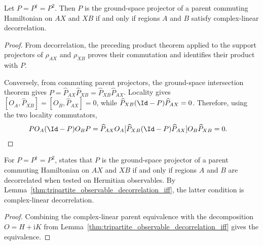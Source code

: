\begin{lemma}
    \label{thm:tripartite_parent_iff_complex_linear_decorrelated}
    \leanok
    Let $P=P^\dagger=P^2$. Then $P$ is the ground-space projector of a
    parent commuting Hamiltonian on $AX$ and $XB$ if and only if regions
    $A$ and $B$ satisfy complex-linear decorrelation.
\end{lemma}

\begin{proof}
    \leanok
    From decorrelation, the preceding product theorem applied to the support
    projectors of $\rho_{AX}$ and $\rho_{XB}$ proves their commutation and
    identifies their product with $P$.

    Conversely, from commuting parent projectors, the ground-space intersection
    theorem gives
    $P=\widehat P_{AX}\widehat P_{XB}
        =\widehat P_{XB}\widehat P_{AX}$. Locality gives
    $[O_A,\widehat P_{XB}]=[O_B,\widehat P_{AX}]=0$, while
    $\widehat P_{XB}(\Id-P)\widehat P_{AX}=0$.
    Therefore, using the two locality commutators,
    \begin{align}
        P O_A(\Id-P)O_B P
         & =\widehat P_{AX}O_A
        [\widehat P_{XB}(\Id-P)\widehat P_{AX}]
        O_B\widehat P_{XB}=0.
        \notag
    \end{align}
\end{proof}

\begin{theorem}
    \label{thm:tripartite_parent_iff_decorrelated}
    \leanok
    For $P=P^\dagger=P^2$,
    \cite[Proposition~D.3, lines 2221--2289]{Cirac2016MPDO_arXiv} states that
    $P$ is the ground-space projector of a parent commuting Hamiltonian on $AX$
    and $XB$ if and only if regions $A$ and $B$ are decorrelated when tested on
    Hermitian observables. By
    Lemma~\ref{thm:tripartite_observable_decorrelation_iff}, the latter
    condition is complex-linear decorrelation.
\end{theorem}

\begin{proof}
    \leanok
    Combining the complex-linear parent equivalence with the decomposition
    $O=H+\mathrm{i}K$ from
    Lemma~\ref{thm:tripartite_observable_decorrelation_iff} gives the
    equivalence.
\end{proof}
